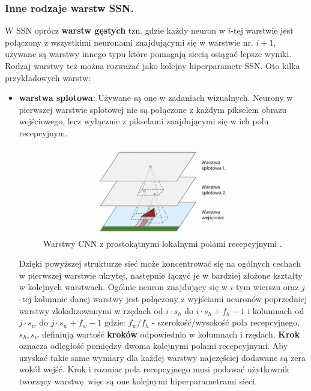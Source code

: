 \documentclass{article}
\begin{document}
\subsubsection{Inne rodzaje warstw SSN.}
\label{sec:warstwy}
W SSN oprócz \textbf{warstw gęstych} tzn.
gdzie każdy neuron w $i$-tej warstwie jest połączony z wszystkimi neuronami
znajdującymi się w warstwie nr. $i+1$,
używane są warstwy innego typu które pomagają siecią
osiągać lepsze wyniki. Rodzaj warstwy też można rozważać jako kolejny
hiperparametr SSN. Oto kilka przykładowych warstw:
\begin{itemize}
\item \textbf{warstwa splotowa}:
Używane są one w zadaniach wizualnych. Neurony w pierwszej warstwie splotowej nie są
połączone z każdym pikselem obrazu wejściowego, lecz wyłącznie z pikselami
znajdującymi się w ich polu recepcyjnym.

\begin{figure}[H]
\centering
\includegraphics[scale=0.6]{cnn.png}
\caption{Warstwy CNN z prostokątnymi lokalnymi polami recepcyjnymi \cite{um}.}
\end{figure}

Dzięki powyższej strukturze sieć może koncentrować się na ogólnych cechach w pierwszej warstwie
ukrytej, następnie łączyć je w bardziej złożone kształty w kolejnych warstwach. Ogólnie neuron
znajdujący się w $i$-tym wierszu oraz $j$-tej kolumnie danej warstwy jest połączony z wyjściami 
neuronów poprzedniej warstwy zlokalizowanymi w rzędach od $i \cdot s_h$ do 
$i \cdot s_h + f_h-1$  i kolumnach
od $j \cdot s_w $ do $j \cdot s_w + f_w-1$
gdzie: $f_w/f_h$ - szerokość/wysokość pola recepcyjnego, $s_h, s_w$ definiują wartość 
\textbf{kroków} odpowiednio w kolumnach i rzędach. \textbf{Krok}  oznacza odległość
pomiędzy dwoma kolejnymi polami recepcyjnymi. Aby uzyskać takie same wymiary 
dla każdej warstwy najczęściej dodawane są zera wokół wejść. Krok i rozmiar pola recepcyjnego
musi podawać użytkownik tworzący warstwę więc są one kolejnymi hiperparametrami sieci.\\


\end{itemize}
\end{document}
